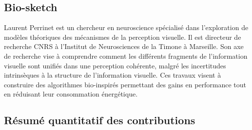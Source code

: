 \documentclass[10pt,french,a4paper,twoside]{article}%
\begin{document}
\subsection*{Bio-sketch}
Laurent Perrinet est un chercheur en neuroscience 
spécialisé dans l'exploration de modèles théoriques des mécanismes de la 
perception visuelle. Il est directeur de recherche CNRS à l'Institut de 
Neurosciences de la Timone à Marseille. Son axe de recherche vise à 
comprendre comment les différents fragments de l'information visuelle sont 
unifiés dans une perception cohérente, malgré les incertitudes intrinsèques 
à la structure de l'information visuelle. Ces travaux visent à construire 
des algorithmes bio-inspirés permettant des gains en performance tout en  
réduisant leur consommation énergétique.

\subsection*{Résumé quantitatif des contributions}
\end{document}
